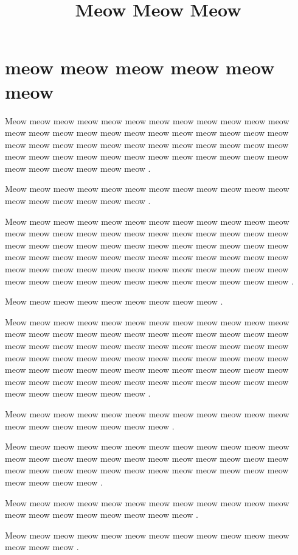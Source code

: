 \documentclass[12pt, a5paper, openany]{book}
\title{Meow Meow Meow }
\begin{document}

\pagecolor{Green}
\thispagestyle{empty}
\maketitle
\pagecolor{white}

\tableofcontents
\clearpage

\setcounter{page}{1}

\chapter{meow meow meow meow meow meow }Meow meow meow meow meow meow meow meow meow meow meow meow meow meow meow meow meow meow meow meow meow meow meow meow meow meow meow meow meow meow meow meow meow meow meow meow meow meow meow meow meow meow meow meow meow meow meow meow meow meow meow meow meow meow .

Meow meow meow meow meow meow meow meow meow meow meow meow meow meow meow meow meow meow .

Meow meow meow meow meow meow meow meow meow meow meow meow meow meow meow meow meow meow meow meow meow meow meow meow meow meow meow meow meow meow meow meow meow meow meow meow meow meow meow meow meow meow meow meow meow meow meow meow meow meow meow meow meow meow meow meow meow meow meow meow meow meow meow meow meow meow meow meow meow meow meow meow .

Meow meow meow meow meow meow meow meow meow .

Meow meow meow meow meow meow meow meow meow meow meow meow meow meow meow meow meow meow meow meow meow meow meow meow meow meow meow meow meow meow meow meow meow meow meow meow meow meow meow meow meow meow meow meow meow meow meow meow meow meow meow meow meow meow meow meow meow meow meow meow meow meow meow meow meow meow meow meow meow meow meow meow meow meow meow meow meow meow .

Meow meow meow meow meow meow meow meow meow meow meow meow meow meow meow meow meow meow meow .

Meow meow meow meow meow meow meow meow meow meow meow meow meow meow meow meow meow meow meow meow meow meow meow meow meow meow meow meow meow meow meow meow meow meow meow meow meow meow meow meow .

Meow meow meow meow meow meow meow meow meow meow meow meow meow meow meow meow meow meow meow meow .

Meow meow meow meow meow meow meow meow meow meow meow meow meow meow meow .
\end{document}
